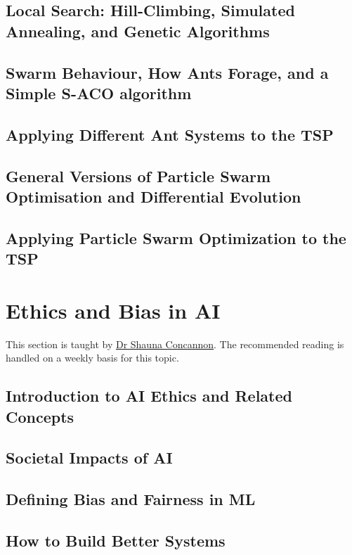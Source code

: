 \subsection{Local Search: Hill-Climbing, Simulated Annealing, and Genetic Algorithms}

\subsection{Swarm Behaviour, How Ants Forage, and a Simple S-ACO algorithm}

\subsection{Applying Different Ant Systems to the TSP}

\subsection{General Versions of Particle Swarm Optimisation and Differential Evolution}

\subsection{Applying Particle Swarm Optimization to the TSP}

\section{Ethics and Bias in AI}

This section is taught by \hyperref[lecturer-shaunaconcannon]{Dr Shauna Concannon}. The recommended reading is handled on a weekly basis for this topic.

\subsection{Introduction to AI Ethics and Related Concepts} 

\subsection{Societal Impacts of AI}  

\subsection{Defining Bias and Fairness in ML}

\subsection{How to Build Better Systems}

